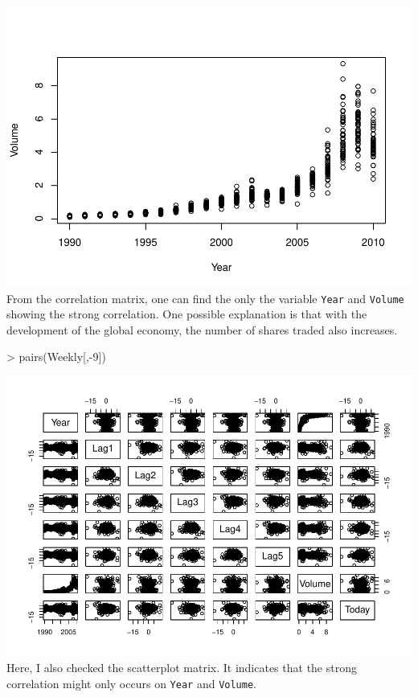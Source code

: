 \documentclass[
]{article}
\newenvironment{Shaded}{\begin{snugshade}}{\end{snugshade}}
\newcommand{\DecValTok}[1]{\textcolor[rgb]{0.00,0.00,0.81}{#1}}
\newcommand{\FunctionTok}[1]{\textcolor[rgb]{0.00,0.00,0.00}{#1}}
\newcommand{\NormalTok}[1]{#1}
\newcommand{\SpecialCharTok}[1]{\textcolor[rgb]{0.00,0.00,0.00}{#1}}
\begin{document}
\includegraphics{Homework_09_new_Pan_files/figure-latex/unnamed-chunk-12-1.pdf}
From the correlation matrix, one can find the only the variable
\texttt{Year} and \texttt{Volume} showing the strong correlation. One
possible explanation is that with the development of the global economy,
the number of shares traded also increases.

\begin{Shaded}
\begin{Highlighting}[]
\SpecialCharTok{\textgreater{}} \FunctionTok{pairs}\NormalTok{(Weekly[,}\SpecialCharTok{{-}}\DecValTok{9}\NormalTok{])}
\end{Highlighting}
\end{Shaded}

\includegraphics{Homework_09_new_Pan_files/figure-latex/unnamed-chunk-13-1.pdf}
Here, I also checked the scatterplot matrix. It indicates that the
strong correlation might only occurs on \texttt{Year} and
\texttt{Volume}.
\end{document}
